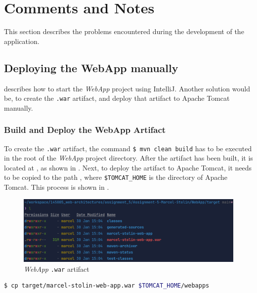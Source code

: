 \newpage
\section{Comments and Notes}\label{sec:04_comments}
This section describes the problems encountered during the development of the application.


\subsection{Deploying the WebApp manually}\label{sec:04_comments_webapp}
 describes how to start the \textit{WebApp} project using IntelliJ. Another solution would be, to create the \texttt{.war} artifact, and deploy that artifact to Apache Tomcat manually.

\subsubsection{Build and Deploy the WebApp Artifact}\label{sec:04_comments_webapp_artifact}
To create the \texttt{.war} artifact, the command \texttt{\$ mvn clean build} has to be executed in the root of the \textit{WebApp} project directory.
After the artifact has been built, it is located at , as shown in . Next, to deploy the artifact to Apache Tomcat, it needs to be copied to the path , where \texttt{\$TOMCAT\_HOME} is the directory of Apache Tomcat. This process is shown in .

\begin{figure}[h]
\centering
\includegraphics[scale=0.2]{images/04_comments/webapp-artifact}
\caption{\textit{WebApp} \texttt{.war} artifact}
\label{fig:04_comments_webapp_artifact_created}
\end{figure}

\begin{lstlisting}[label=lst:04_comments_webapp_artifact_deploy, caption=Artifact deployment command, language=sh]
$ cp target/marcel-stolin-web-app.war $TOMCAT_HOME/webapps
\end{lstlisting}

